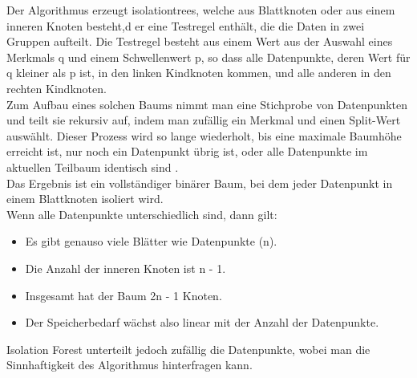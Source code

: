 \documentclass[a4paper,12pt]{article}
\begin{document}
	Der Algorithmus erzeugt \gls{isolationtree}s, welche aus Blattknoten oder aus einem inneren Knoten besteht,d er eine Testregel enthält, die die Daten in zwei Gruppen aufteilt. Die Testregel besteht aus einem Wert aus der Auswahl eines Merkmals  q und einem Schwellenwert p, so dass alle Datenpunkte, deren Wert für q kleiner als p ist, in den linken Kindknoten kommen, und alle anderen in den rechten Kindknoten.
	\\[0.5em]
	Zum Aufbau eines solchen Baums nimmt man eine Stichprobe von Datenpunkten und teilt sie rekursiv auf, indem man zufällig ein Merkmal und einen Split-Wert auswählt. Dieser Prozess wird so lange wiederholt, bis
	eine maximale Baumhöhe erreicht ist, nur noch ein Datenpunkt übrig ist, oder
	alle Datenpunkte im aktuellen Teilbaum identisch sind \cite{liu2008isolation}.
	\\[0.5em]
	Das Ergebnis ist ein vollständiger binärer Baum, bei dem jeder Datenpunkt in einem Blattknoten isoliert wird.
	\\[0.5em]
	Wenn alle Datenpunkte unterschiedlich sind, dann gilt:
	\begin{itemize}
	\item Es gibt genauso viele Blätter wie Datenpunkte (n).
	
	\item Die Anzahl der inneren Knoten ist n - 1.
	
	\item Insgesamt hat der Baum 2n - 1 Knoten.
	
	\item Der Speicherbedarf wächst also linear mit der Anzahl der Datenpunkte.
	\end{itemize}
	
	Isolation Forest unterteilt jedoch zufällig die Datenpunkte, wobei man die Sinnhaftigkeit des Algorithmus hinterfragen kann.
	
\end{document}
